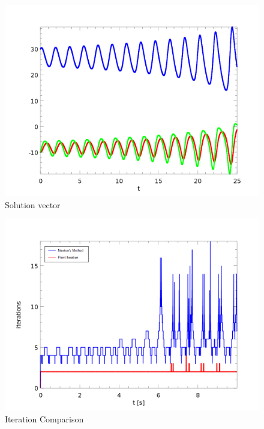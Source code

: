 \documentclass[12pt,twocolumn]{article}
\begin{document}
\begin{figure}
\includegraphics[width=\columnwidth]{plots/xyz_impl.png}
\footnotesize{\caption{Solution vector}}
\end{figure}

\begin{figure}
\includegraphics[width=\columnwidth]{plots/iterations.png}
\footnotesize{\caption{Iteration Comparison}}
\end{figure}
\end{document}
